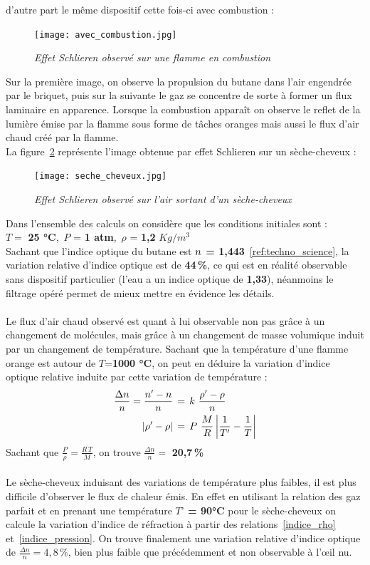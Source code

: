 d'autre part le même dispositif cette fois-ci avec combustion :\\
\begin{figure}[H]
	\centering
	\texttt{[image: avec\_combustion.jpg]}
	\caption{\small{\textit{Effet Schlieren observé sur une flamme en combustion}}}
	\label{fig:avec_combustion}
\end{figure}
Sur la première image, on observe la propulsion du butane dans l’air engendrée par le briquet, puis sur la suivante le gaz se concentre de sorte à former un flux laminaire en apparence. Lorsque la combustion apparaît on observe le reflet de la lumière émise par la flamme sous forme de tâches oranges mais aussi le flux d’air chaud créé par la flamme. \\
La figure~\ref{fig:seche_cheveux} représente l'image obtenue par effet Schlieren sur un sèche-cheveux :
\begin{figure}[H]
	\centering
	\texttt{[image: seche\_cheveux.jpg]}
	\caption{\small{\textit{Effet Schlieren observé sur l'air sortant d'un sèche-cheveux}}}
	\label{fig:seche_cheveux}
\end{figure}
Dans l’ensemble des calculs on considère que les conditions initiales sont : \\
$T =$ \textbf{25 °C}, \,$P$ = \textbf{1 atm}, \,$\rho$ = \textbf{1,2} $Kg/m^{3}$\\

Sachant que l’indice optique du butane est \textbf{$\mathnormal{n}$ = 1,443}~\ref{ref:techno_science}, la variation relative d’indice optique est de \textbf{44\,\%}, ce qui est en réalité observable sans dispositif particulier (l’eau a un indice optique de \textbf{1,33}), néanmoins le filtrage opéré permet de mieux mettre en évidence les détails.\\ \\
Le flux d’air chaud observé est quant à lui observable non pas grâce à un changement de molécules, mais grâce à un changement de masse volumique induit par un changement de température. Sachant que la température d'une flamme orange est autour de $T$=\textbf{1000 °C}, on peut en déduire la variation d'indice optique relative induite par cette variation de température :
\begin{align}
	\frac{\Delta n}{n}=\frac{n'-n}{n} \,&= \, k \,\,\frac{\rho' - \rho}{n}
	\label{indice_rho}\\
	|\rho' - \rho| \,&= \, P \,\,\frac{M}{R}\,\bigg{|}\frac{1}{T'}-\frac{1}{T}\bigg{|}
	\label{indice_pression}
\end{align}
Sachant que $\frac{P}{\rho} = \frac{R\, T}{M}$, on trouve $\frac{\Delta n}{n} = $ \textbf{20,7\,\%}\\
\\
Le sèche-cheveux induisant des variations de température plus faibles, il est plus difficile d’observer le flux de chaleur émis. En effet en utilisant la relation des gaz parfait et en prenant une température \textbf{$T’$ = 90°C} pour le sèche-cheveux on calcule la variation d'indice de réfraction à partir des relations~\ref{indice_rho} et~\ref{indice_pression}. On trouve finalement une variation relative d’indice optique de $\frac{\Delta n}{n} = 4,8\,\%$, bien plus faible que précédemment et non observable à l'œil nu.
